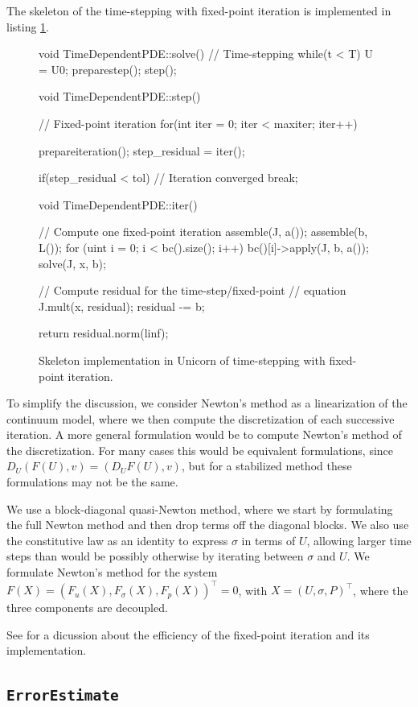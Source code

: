The skeleton of the time-stepping with fixed-point iteration is
implemented in listing \ref{code:time-stepping}.


\begin{figure}[!h]
{\small
\begin{c++}
void TimeDependentPDE::solve()
{
  // Time-stepping
  while(t < T)
  {
    U = U0;
    preparestep();
    step();
  }
}

void TimeDependentPDE::step()
{
  // Fixed-point iteration
  for(int iter = 0; iter < maxiter; iter++)
  {
    prepareiteration();
    step_residual = iter();

    if(step_residual < tol)
    {
      // Iteration converged
      break;
    }
  }
}

void TimeDependentPDE::iter()
{
  // Compute one fixed-point iteration
  assemble(J, a());
  assemble(b, L());
  for (uint i = 0; i < bc().size(); i++)
    bc()[i]->apply(J, b, a());
  solve(J, x, b);

  // Compute residual for the time-step/fixed-point
  // equation
  J.mult(x, residual);
  residual -= b;

  return residual.norm(linf);
}
\end{c++}
}
\label{code:time-stepping}
\caption{
Skeleton implementation in Unicorn of time-stepping with fixed-point
iteration.}
\end{figure}

To simplify the discussion, we consider Newton's method as a
linearization of the continuum model, where we then compute the
discretization of each successive iteration. A more general
formulation would be to compute Newton's method of the
discretization. For many cases this would be equivalent formulations,
since $D_U (F(U), v) = (D_U F(U), v)$, but for a stabilized method
these formulations may not be the same.

We use a block-diagonal quasi-Newton method, where we start by
formulating the full Newton method and then drop terms off the
diagonal blocks. We also use the constitutive law as an identity to
express $\sigma$ in terms of $U$, allowing larger time steps than
would be possibly otherwise by iterating between $\sigma$ and $U$. We
formulate Newton's method for the system $F(X) = (F_u(X), F_\sigma(X),
F_p(X))^\top = 0$, with $X = (U, \sigma, P)^\top$, where the three
components are decoupled.

See \cite{Jansson2009} for a dicussion about
the efficiency of the fixed-point iteration and its implementation.

\subsection{\tt ErrorEstimate}

